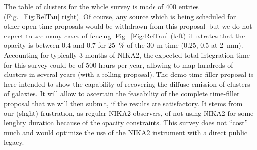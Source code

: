 \documentclass[10pt,a4paper,twoside,graphicx,color]{article}
\begin{document}
The table of clusters for the whole survey is made of 400 entries
(Fig.~\ref{Fig:RelTau} right). Of course, any source which is being
scheduled for other open time proposals would be withdrawn from this
proposal, but we do not expect to see many cases of fencing.
Fig.~\ref{Fig:RelTau} (left) illustrates that the opacity is between
0.4 and 0.7 for 25~\% of the 30~m time (0.25, 0.5 at 2~mm). Accounting
for typically 3 months of NIKA2, the expected total integration time
for this survey could be of 500 hours per year, allowing to map
hundreds of clusters in several years (with a rolling proposal). The
demo time-filler proposal is here intended to show the capability of
recovering the diffuse emission of clusters of galaxies. It will allow
to ascertain the feasability of the complete time-filler proposal that
we will then submit, if the results are satisfactory. It stems from
our (slight) frustration, as regular NIKA2 observers, of not using
NIKA2 for some lenghty duration because of the opacity
constraints. This survey does not ``cost'' much and would optimize the
use of the NIKA2 instrument with a direct public legacy.\\
\def\aj{AJ}%
\def\actaa{Acta Astron.}%
\def\araa{ARA\&A}%
\def\apj{ApJ}%
\def\apjl{ApJ}%
\def\apjs{ApJS}%
\def\ao{Appl.~Opt.}%
\def\apss{Ap\&SS}%
\def\aap{A\&A}%
\def\aapr{A\&A~Rev.}%
\def\aaps{A\&AS}%
\def\azh{AZh}%
\def\baas{BAAS}%
\def\bac{Bull. astr. Inst. Czechosl.}%
\def\caa{Chinese Astron. Astrophys.}%
\def\cjaa{Chinese J. Astron. Astrophys.}%
\def\icarus{Icarus}%
\def\jcap{J. Cosmology Astropart. Phys.}%
\def\jrasc{JRASC}%
\def\mnras{MNRAS}%
\def\memras{MmRAS}%
\def\na{New A}%
\def\nar{New A Rev.}%
\end{document}

